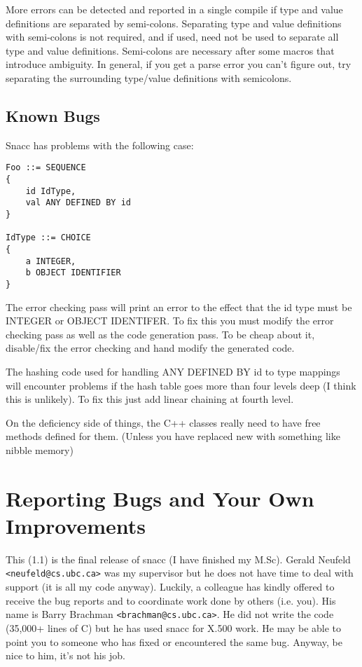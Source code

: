 More errors can be detected and reported in a single compile if type
and value definitions are separated by semi-colons.  Separating type
and value definitions with semi-colons is not required, and if used,
need not be used to separate all type and value definitions.
Semi-colons are necessary after some macros that introduce ambiguity.
In general, if you get a parse error you can't figure out, try
separating the surrounding type/value definitions with semicolons.


\subsection{Known Bugs}

Snacc has problems with the following case:

\begin{verbatim}
Foo ::= SEQUENCE
{
    id IdType,
    val ANY DEFINED BY id
}

IdType ::= CHOICE
{
    a INTEGER,
    b OBJECT IDENTIFIER
}
\end{verbatim}

The error checking pass will print an error to the effect that the id
type must be INTEGER or OBJECT IDENTIFER\@.  To fix this you must modify
the error checking pass as well as the code generation pass.  To be
cheap about it, disable/fix the error checking and hand modify the
generated code.

The hashing code used for handling ANY DEFINED BY id to type mappings
will encounter problems if the hash table goes more than four levels
deep (I think this is unlikely).  To fix this just add linear chaining
at fourth level.

On the deficiency side of things, the C++ classes really need to have
free methods defined for them. (Unless you have replaced new with
something like nibble memory)

\section{\label{old-bug-section}Reporting Bugs and Your Own Improvements}

This (1.1) is the final release of snacc (I have finished my M.Sc).
Gerald Neufeld \verb$<neufeld@cs.ubc.ca>$ was my supervisor but he
does not have time to deal with support (it is all my code anyway).
Luckily, a colleague has kindly offered to receive the bug reports and
to coordinate work done by others (i.e.  you).  His name is Barry
Brachman \verb$<brachman@cs.ubc.ca>$.  He did not write the code
(35,000+ lines of C) but he has used snacc for X.500 work.  He may be
able to point you to someone who has fixed or encountered the same
bug.  Anyway, be nice to him, it's not his job.

